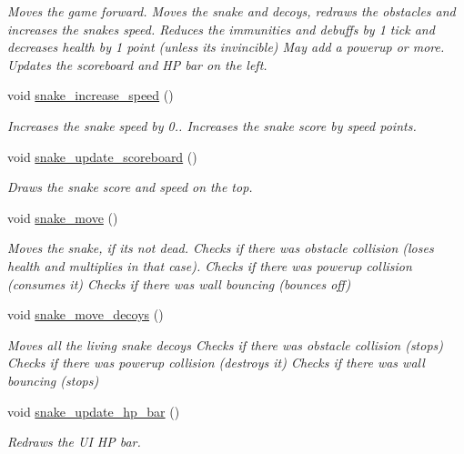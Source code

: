 \begin{DoxyCompactItemize}
\begin{DoxyCompactList}\small\item\em Moves the game forward. Moves the snake and decoys, redraws the obstacles and increases the snake\textquotesingle{}s speed. Reduces the immunities and debuffs by 1 tick and decreases health by 1 point (unless it\textquotesingle{}s invincible) May add a powerup or more. Updates the scoreboard and HP bar on the left. \end{DoxyCompactList}\item 
void \mbox{\hyperlink{group__snake_gac8f7c40125feaa0d1e72d6a032882f49}{snake\+\_\+increase\+\_\+speed}} ()
\begin{DoxyCompactList}\small\item\em Increases the snake speed by 0.. Increases the snake score by speed points. \end{DoxyCompactList}\item 
void \mbox{\hyperlink{group__snake_ga62eda6f8af6d324996f0a633f543e45f}{snake\+\_\+update\+\_\+scoreboard}} ()
\begin{DoxyCompactList}\small\item\em Draws the snake score and speed on the top. \end{DoxyCompactList}\item 
void \mbox{\hyperlink{group__snake_ga18a5d5f3ad1a2a71338cf50900d6169e}{snake\+\_\+move}} ()
\begin{DoxyCompactList}\small\item\em Moves the snake, if it\textquotesingle{}s not dead. Checks if there was obstacle collision (loses health and multiplies in that case). Checks if there was powerup collision (consumes it) Checks if there was wall bouncing (bounces off) \end{DoxyCompactList}\item 
void \mbox{\hyperlink{group__snake_gae3dcf4434c60729af7c3280262e8c6ad}{snake\+\_\+move\+\_\+decoys}} ()
\begin{DoxyCompactList}\small\item\em Moves all the living snake decoys Checks if there was obstacle collision (stops) Checks if there was powerup collision (destroys it) Checks if there was wall bouncing (stops) \end{DoxyCompactList}\item 
void \mbox{\hyperlink{group__snake_ga51b55e1ad05667d456ed81db42c26b9f}{snake\+\_\+update\+\_\+hp\+\_\+bar}} ()
\begin{DoxyCompactList}\small\item\em Redraws the UI HP bar. \end{DoxyCompactList}\item 

\end{DoxyCompactItemize}
